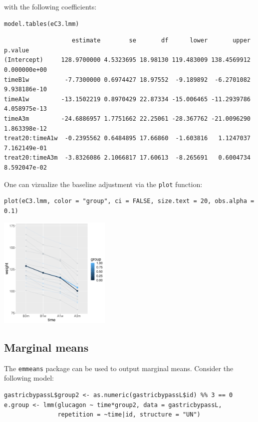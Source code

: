\documentclass[12pt]{article}
\begin{document}
with the following coefficients:
\lstset{language=r,label= ,caption= ,captionpos=b,numbers=none}
\begin{lstlisting}
model.tables(eC3.lmm)
\end{lstlisting}

\begin{verbatim}
                   estimate        se       df      lower       upper      p.value
(Intercept)     128.9700000 4.5323695 18.98130 119.483009 138.4569912 0.000000e+00
timeB1w          -7.7300000 0.6974427 18.97552  -9.189892  -6.2701082 9.938186e-10
timeA1w         -13.1502219 0.8970429 22.87334 -15.006465 -11.2939786 4.058975e-13
timeA3m         -24.6886957 1.7751662 22.25061 -28.367762 -21.0096290 1.863398e-12
treat20:timeA1w  -0.2395562 0.6484895 17.66860  -1.603816   1.1247037 7.162149e-01
treat20:timeA3m  -3.8326086 2.1066817 17.60613  -8.265691   0.6004734 8.592047e-02
\end{verbatim}


One can vizualize the baseline adjustment via the \texttt{plot} function:
\lstset{language=r,label= ,caption= ,captionpos=b,numbers=none}
\begin{lstlisting}
plot(eC3.lmm, color = "group", ci = FALSE, size.text = 20, obs.alpha = 0.1) 
\end{lstlisting}

\begin{center}
\includegraphics[width=0.4\textwidth]{./figures/gg-baseAdj.pdf}
\end{center}

\subsection{Marginal means}
\label{sec:org673381d}

The \texttt{emmeans} package can be used to output marginal means. Consider
the following model:
\lstset{language=r,label= ,caption= ,captionpos=b,numbers=none}
\begin{lstlisting}
gastricbypassL$group2 <- as.numeric(gastricbypassL$id) %% 3 == 0
e.group <- lmm(glucagon ~ time*group2, data = gastricbypassL,
               repetition = ~time|id, structure = "UN")
\end{lstlisting}
\end{document}

